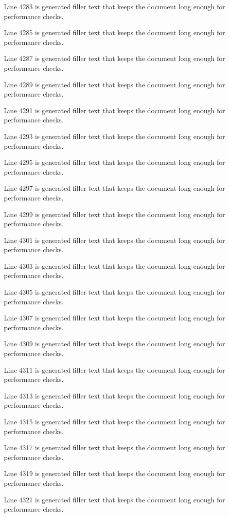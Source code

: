 Line 4283 is generated filler text that keeps the document long enough for performance checks.

Line 4285 is generated filler text that keeps the document long enough for performance checks.

Line 4287 is generated filler text that keeps the document long enough for performance checks.

Line 4289 is generated filler text that keeps the document long enough for performance checks.

Line 4291 is generated filler text that keeps the document long enough for performance checks.

Line 4293 is generated filler text that keeps the document long enough for performance checks.

Line 4295 is generated filler text that keeps the document long enough for performance checks.

Line 4297 is generated filler text that keeps the document long enough for performance checks.

Line 4299 is generated filler text that keeps the document long enough for performance checks.

Line 4301 is generated filler text that keeps the document long enough for performance checks.

Line 4303 is generated filler text that keeps the document long enough for performance checks.

Line 4305 is generated filler text that keeps the document long enough for performance checks.

Line 4307 is generated filler text that keeps the document long enough for performance checks.

Line 4309 is generated filler text that keeps the document long enough for performance checks.

Line 4311 is generated filler text that keeps the document long enough for performance checks.

Line 4313 is generated filler text that keeps the document long enough for performance checks.

Line 4315 is generated filler text that keeps the document long enough for performance checks.

Line 4317 is generated filler text that keeps the document long enough for performance checks.

Line 4319 is generated filler text that keeps the document long enough for performance checks.

Line 4321 is generated filler text that keeps the document long enough for performance checks.

